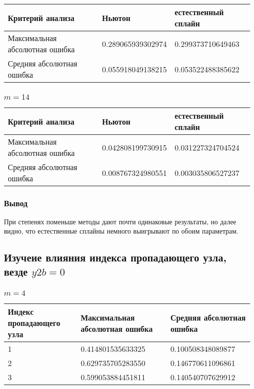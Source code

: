 \documentclass[paper=a4, fontsize=11pt]{scrartcl} %
\numberwithin{equation}{section} %
\numberwithin{figure}{section} %
\numberwithin{table}{section} %
\begin{document}
\begin{tabular}{|p{4 cm}|p{4 cm}|p{4 cm}|}
\hline
	Критерий анализа & Ньютон & естественный сплайн \\
\hline 
	Максимальная абсолютная ошибка & 0.289065939302974 & 0.299373710649463\\
\hline 
	Средняя абсолютная ошибка & 0.055918049138215 & 0.053522488385622\\
\hline
\end{tabular}

\subsubsection{$m=14$}

\begin{tabular}{|p{4 cm}|p{4 cm}|p{4 cm}|}
\hline
	Критерий анализа & Ньютон & естественный сплайн \\
\hline 
	Максимальная абсолютная ошибка & 0.042808199730915 & 0.031227324704524\\
\hline 
	Средняя абсолютная ошибка & 0.008767324980551 & 0.003035806527237\\
\hline
\end{tabular}

\subsubsection{Вывод}

При степенях поменьше методы дают почти одинаковые результаты, но далее видно, что естественные сплайны немного выигрывают по обоим параметрам.

\subsection{Изучеие влияния индекса пропадающего узла, везде $y2b=0$}

\subsubsection{$m=4$}

\begin{tabular}{|p{4 cm}|p{4 cm}|p{4 cm}|}
\hline
	Индекс пропадающего узла & Максимальная абсолютная ошибка & Средняя абсолютная ошибка\\
\hline
	1 & 0.414801535633325 & 0.100508348089877\\
\hline
	2 & 0.629735705283550 & 0.146770611096861\\
\hline
	3 & 0.599053884451811 & 0.140540707629912\\
\hline
\end{tabular}
\end{document}
